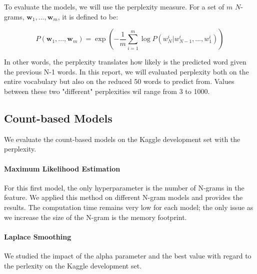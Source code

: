 \documentclass[11pt]{article}
\begin{document}
To evaluate the models, we will use the perplexity measure. For a set of $m$ $N$-grams, $\boldsymbol{w}_1,...,\boldsymbol{w}_m$, it is defined to be:

$$ P(\boldsymbol{w}_1,...,\boldsymbol{w}_m) = \exp\left(-\frac{1}{m} \sum\limits_{i = 1}^{m} \log P(w_N^i|w_{N-1}^i,...,w_1^i)\right)$$

\noindent In other words, the perplexity translates how likely is the predicted word given the previous N-1 words. In this report, we will evaluated perplexity both on the entire vocabulary but also on the reduced 50 words to predict from. Values between these two "different" perplexities wil range from 3 to 1000.

\subsection{Count-based Models}

We evaluate the count-based models on the Kaggle development set with the perplexity.

\paragraph{Maximum Likelihood Estimation}

For this first model, the only hyperparameter is the number of N-grams in the feature. We applied this method on different N-gram models and provides the results. The computation time remains very low for each model; the only issue as we increase the size of the N-gram is the memory footprint.

\paragraph{Laplace Smoothing}

We studied the impact of the alpha parameter and the best value with regard to the perlexity on the Kaggle development set.
\end{document}
